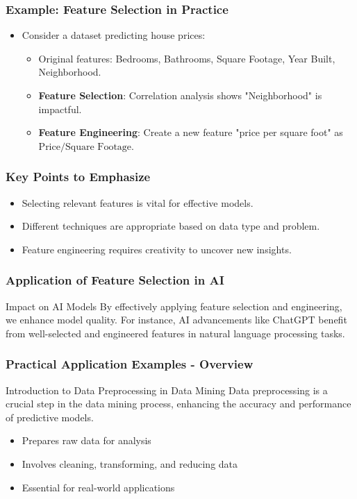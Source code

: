 \documentclass[aspectratio=169]{beamer}
\begin{document}
\begin{frame}[fragile]
    \frametitle{Example: Feature Selection in Practice}
    \begin{itemize}
        \item Consider a dataset predicting house prices:
        \begin{itemize}
            \item Original features: Bedrooms, Bathrooms, Square Footage, Year Built, Neighborhood.
            \item \textbf{Feature Selection}: Correlation analysis shows "Neighborhood" is impactful.
            \item \textbf{Feature Engineering}: Create a new feature "price per square foot" as \( \text{Price} / \text{Square Footage} \).
        \end{itemize}
    \end{itemize}
\end{frame}

\begin{frame}[fragile]
    \frametitle{Key Points to Emphasize}
    \begin{itemize}
        \item Selecting relevant features is vital for effective models.
        \item Different techniques are appropriate based on data type and problem.
        \item Feature engineering requires creativity to uncover new insights.
    \end{itemize}
\end{frame}

\begin{frame}[fragile]
    \frametitle{Application of Feature Selection in AI}
    \begin{block}{Impact on AI Models}
        By effectively applying feature selection and engineering, we enhance model quality. For instance, AI advancements like ChatGPT benefit from well-selected and engineered features in natural language processing tasks.
    \end{block}
\end{frame}

\begin{frame}[fragile]
    \frametitle{Practical Application Examples - Overview}
    \begin{block}{Introduction to Data Preprocessing in Data Mining}
        Data preprocessing is a crucial step in the data mining process, enhancing the accuracy and performance of predictive models. 
        \begin{itemize}
            \item Prepares raw data for analysis
            \item Involves cleaning, transforming, and reducing data 
            \item Essential for real-world applications
        \end{itemize}
    \end{block}
\end{frame}
\end{document}
